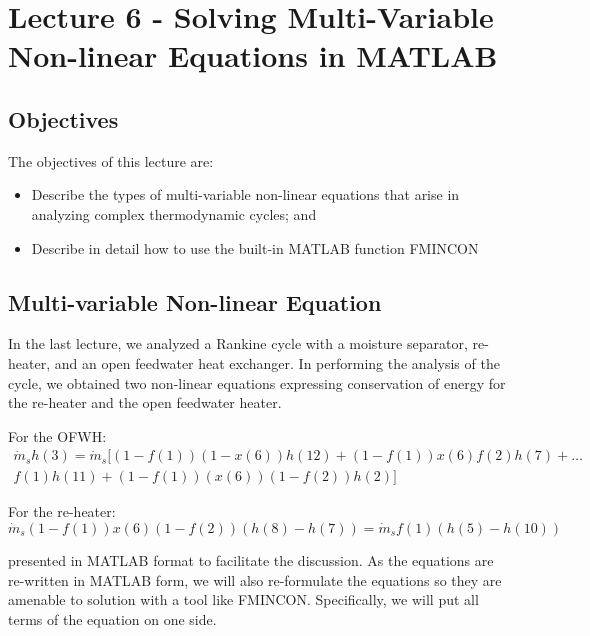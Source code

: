 \chapter{Lecture 6 - Solving Multi-Variable Non-linear Equations in MATLAB}
\label{ch:ch6}
\section{Objectives}
The objectives of this lecture are:
\begin{itemize}
\item Describe the types of multi-variable non-linear equations that arise in analyzing complex thermodynamic cycles; and
\item Describe in detail how to use the built-in MATLAB function FMINCON
\end{itemize}

\section{Multi-variable Non-linear Equation}
In the last lecture, we analyzed a Rankine cycle with a moisture separator, re-heater, and an open feedwater heat exchanger.  In performing the analysis of the cycle, we obtained two non-linear equations expressing conservation of energy for the re-heater and the open feedwater heater.  

For the OFWH:
\begin{multline}
\dot{m}_s h(3) = \dot{m}_s [(1-f(1))(1-x(6))h(12) + (1-f(1))x(6)f(2)h(7) + \dots \\
 f(1)h(11) + (1-f(1))(x(6))(1-f(2))h(2) ] 
\label{eq:Ebal_OFWH1}
\end{multline}

For the re-heater:
\begin{equation}
\dot{m}_s(1-f(1))x(6)(1-f(2))(h(8)-h(7)) = \dot{m}_s f(1)(h(5)-h(10))
\label{eq:Ebal_RH1}
\end{equation}

 presented in MATLAB format to facilitate the discussion.  As the equations are re-written in MATLAB form, we will also re-formulate the equations so they are amenable to solution with a tool like FMINCON.  Specifically, we will put all terms of the equation on one side.

